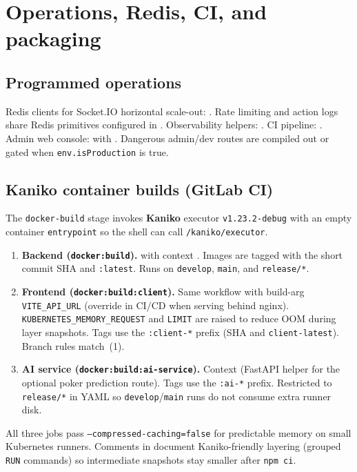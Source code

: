 \documentclass[11pt,a4paper]{article}
\begin{document}
\section{Operations, Redis, CI, and packaging}
\label{app:ops}

\subsection{Programmed operations}

Redis clients for Socket.IO horizontal scale-out: . Rate limiting and action logs share Redis primitives configured in . Observability helpers: . CI pipeline: . Admin web console:  with . Dangerous admin/dev routes are compiled out or gated when \texttt{env.isProduction} is true.

\subsection{Kaniko container builds (GitLab CI)}

The \texttt{docker-build} stage invokes \textbf{Kaniko} executor \texttt{v1.23.2-debug} with an empty container \texttt{entrypoint} so the shell can call \texttt{/kaniko/executor}.

\begin{enumerate}
\item \textbf{Backend (\texttt{docker:build}).}  with context . Images are tagged with the short commit SHA and \texttt{:latest}. Runs on \texttt{develop}, \texttt{main}, and \texttt{release/*}.
\item \textbf{Frontend (\texttt{docker:build:client}).} Same  workflow with build-arg \texttt{VITE\_API\_URL} (override in CI/CD when serving behind nginx). \texttt{KUBERNETES\_MEMORY\_REQUEST} and \texttt{LIMIT} are raised to reduce OOM during layer snapshots. Tags use the \texttt{:client-*} prefix (SHA and \texttt{client-latest}). Branch rules match~(1).
\item \textbf{AI service (\texttt{docker:build:ai-service}).} Context  (FastAPI helper for the optional poker prediction route). Tags use the \texttt{:ai-*} prefix. Restricted to \texttt{release/*} in YAML so \texttt{develop}/\texttt{main} runs do not consume extra runner disk.
\end{enumerate}

All three jobs pass \texttt{--compressed-caching=false} for predictable memory on small Kubernetes runners. Comments in  document Kaniko-friendly layering (grouped \texttt{RUN} commands) so intermediate snapshots stay smaller after \texttt{npm ci}.
\end{document}
